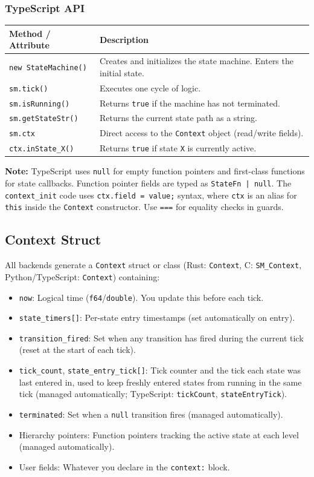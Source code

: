 \documentclass[a4paper,11pt]{article}
\begin{document}
\subsubsection*{TypeScript API}
\begin{longtable}{@{}lp{10cm}@{}}
\toprule
\textbf{Method / Attribute} & \textbf{Description} \\
\midrule
\endhead
\texttt{new StateMachine()} & Creates and initializes the state machine. Enters the initial state. \\
\texttt{sm.tick()} & Executes one cycle of logic. \\
\texttt{sm.isRunning()} & Returns \texttt{true} if the machine has not terminated. \\
\texttt{sm.getStateStr()} & Returns the current state path as a string. \\
\texttt{sm.ctx} & Direct access to the \texttt{Context} object (read/write fields). \\
\texttt{ctx.inState\_X()} & Returns \texttt{true} if state \texttt{X} is currently active. \\
\bottomrule
\end{longtable}

\textbf{Note:} TypeScript uses \texttt{null} for empty function pointers and first-class functions for state callbacks. Function pointer fields are typed as \texttt{StateFn | null}. The \texttt{context\_init} code uses \texttt{ctx.field = value;} syntax, where \texttt{ctx} is an alias for \texttt{this} inside the \texttt{Context} constructor. Use \texttt{===} for equality checks in guards.

\subsection{Context Struct}
All backends generate a \texttt{Context} struct or class (Rust: \texttt{Context}, C: \texttt{SM\_Context}, Python/TypeScript: \texttt{Context}) containing:

\begin{itemize}
    \item \texttt{now}: Logical time (\texttt{f64}/\texttt{double}). You update this before each tick.
    \item \texttt{state\_timers[]}: Per-state entry timestamps (set automatically on entry).
    \item \texttt{transition\_fired}: Set when any transition has fired during the current tick (reset at the start of each tick).
    \item \texttt{tick\_count}, \texttt{state\_entry\_tick[]}: Tick counter and the tick each state was last entered in, used to keep freshly entered states from running in the same tick (managed automatically; TypeScript: \texttt{tickCount}, \texttt{stateEntryTick}).
    \item \texttt{terminated}: Set when a \texttt{null} transition fires (managed automatically).
    \item Hierarchy pointers: Function pointers tracking the active state at each level (managed automatically).
    \item User fields: Whatever you declare in the \texttt{context:} block.
\end{itemize}
\end{document}
